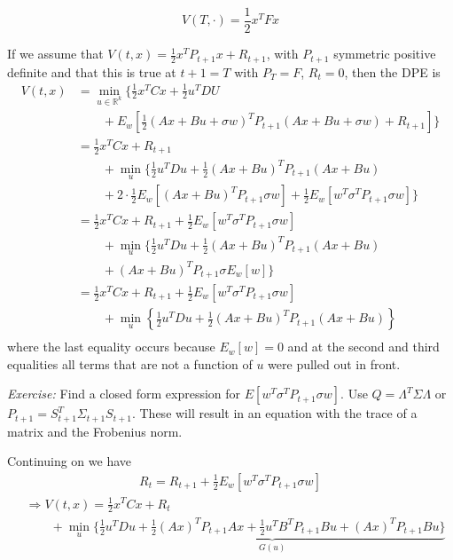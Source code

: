 \begin{equation*}
V(T,\cdot) = \frac{1}{2}x^T Fx
\end{equation*}


If we assume that $V(t,x) = \frac{1}{2}x^T P_{t+1}x + R_{t+1}$, with $P_{t+1}$ symmetric positive definite and that this is true at $t+1=T$ with $P_T=F$, $R_t=0$, then the DPE is
\begin{align*}
V(t,x) &= \min_{u\in\mathbb{R}^k}\{\frac{1}{2}x^T Cx + \frac{1}{2}u^T DU \\
&\qquad + E_w[\frac{1}{2}{(Ax+Bu+\sigma w)}^T P_{t+1}(Ax+Bu+\sigma w) + R_{t+1}]\} \\
&= \frac{1}{2}x^T Cx + R_{t+1} \\
&\qquad + \min_u \{\frac{1}{2}u^T Du + \frac{1}{2}{(Ax+Bu)}^T P_{t+1}(Ax+Bu) \\
&\qquad + 2\cdot\frac{1}{2}E_w[{(Ax+Bu)}^T P_{t+1}\sigma w] + \frac{1}{2}E_w[w^T \sigma^T P_{t+1}\sigma w]\} \\
&= \frac{1}{2}x^T Cx + R_{t+1} + \frac{1}{2}E_w[w^T \sigma^T P_{t+1}\sigma w] \\
&\qquad + \min_u \{ \frac{1}{2}u^T Du + \frac{1}{2}{(Ax+Bu)}^T P_{t+1}(Ax+Bu) \\
&\qquad + {(Ax+Bu)}^T P_{t+1}\sigma E_w[w] \} \\
&= \frac{1}{2}x^T Cx + R_{t+1} + \frac{1}{2}E_w[w^T \sigma^T P_{t+1}\sigma w] \\
&\qquad + \min_u \left\lbrace \frac{1}{2}u^T Du + \frac{1}{2}{(Ax+Bu)}^T P_{t+1}(Ax+Bu) \right\rbrace \\
\end{align*}
where the last equality occurs because $E_w[w]=0$ and at the second and third equalities all terms that are not a function of $u$ were pulled out in front.

\textit{Exercise:} Find a closed form expression for $E[w^T \sigma^T P_{t+1}\sigma w]$.
Use $Q=\Lambda^T\Sigma\Lambda$ or $P_{t+1} = S_{t+1}^T\Sigma_{t+1}S_{t+1}$.
These will result in an equation with the trace of a matrix and the Frobenius norm.

Continuing on we have
\begin{align*}
R_t = R_{t+1} + \frac{1}{2}E_w[w^T \sigma^T P_{t+1}\sigma w]
\end{align*}
\begin{align*}
&\Rightarrow V(t,x) = \frac{1}{2}x^T Cx + R_t \\
&\qquad + \min_u\{ \underbrace{\frac{1}{2}u^T Du + \frac{1}{2}{(Ax)}^T P_{t+1}Ax + \frac{1}{2}u^T B^T P_{t+1}Bu + {(Ax)}^T P_{t+1}Bu\}}_{G(u)}
\end{align*}


